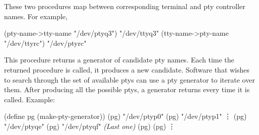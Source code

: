 \begin{desc}
These two procedures map between corresponding terminal and pty controller
names.
For example,
\begin{code}
(pty-name->tty-name "/dev/ptyq3") {\evalto} "/dev/ttyq3"
(tty-name->pty-name "/dev/ttyrc") {\evalto} "/dev/ptyrc"\end{code}

\end{desc}

\begin{desc}
This procedure returns a generator of candidate pty names.
Each time the returned procedure is called, it produces a
new candidate.
Software that wishes to search through the set of available ptys
can use a pty generator to iterate over them.
After producing all the possible ptys, a generator returns {\sharpf}
every time it is called.
Example:
\begin{code}
(define pg (make-pty-generator))
(pg) {\evalto} "/dev/ptyp0"
(pg) {\evalto} "/dev/ptyp1"
        \vdots
(pg) {\evalto} "/dev/ptyqe"
(pg) {\evalto} "/dev/ptyqf"    \textit{(Last one)}
(pg) {\evalto} {\sharpf}
(pg) {\evalto} {\sharpf}
        \vdots\end{code}
\end{desc}



